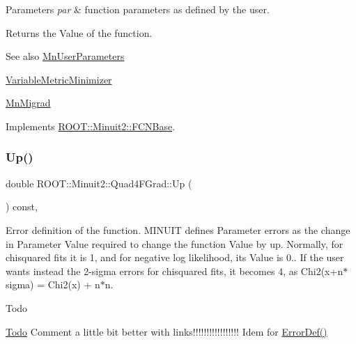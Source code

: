 \begin{DoxyParams}{Parameters}
{\em par} & function parameters as defined by the user.\\
\hline
\end{DoxyParams}
\begin{DoxyReturn}{Returns}
the Value of the function.
\end{DoxyReturn}
\begin{DoxySeeAlso}{See also}
\mbox{\hyperlink{classROOT_1_1Minuit2_1_1MnUserParameters}{Mn\+User\+Parameters}} 

\mbox{\hyperlink{classROOT_1_1Minuit2_1_1VariableMetricMinimizer}{Variable\+Metric\+Minimizer}} 

\mbox{\hyperlink{classROOT_1_1Minuit2_1_1MnMigrad}{Mn\+Migrad}} 
\end{DoxySeeAlso}


Implements \mbox{\hyperlink{classROOT_1_1Minuit2_1_1FCNBase_ae4a86bd94d0d0f5ca6fc8f8ab2bb43cd}{R\+O\+O\+T\+::\+Minuit2\+::\+F\+C\+N\+Base}}.

\mbox{\label{classROOT_1_1Minuit2_1_1Quad4FGrad_a0c477f97bac7a89bea6bdea9fdae92cf}} 
\subsubsection{\texorpdfstring{Up()}{Up()}\hspace{0.1cm}{\footnotesize\ttfamily [1/2]}}
{\footnotesize\ttfamily double R\+O\+O\+T\+::\+Minuit2\+::\+Quad4\+F\+Grad\+::\+Up (\begin{DoxyParamCaption}{ }\end{DoxyParamCaption}) const\hspace{0.3cm}{\ttfamily [inline]}, {\ttfamily [virtual]}}

Error definition of the function. M\+I\+N\+U\+IT defines Parameter errors as the change in Parameter Value required to change the function Value by up. Normally, for chisquared fits it is 1, and for negative log likelihood, its Value is 0.. If the user wants instead the 2-\/sigma errors for chisquared fits, it becomes 4, as Chi2(x+n$\ast$sigma) = Chi2(x) + n$\ast$n.

\begin{DoxyRefDesc}{Todo}
\item[\mbox{\hyperlink{todo__todo000001}{Todo}}]Comment a little bit better with links!!!!!!!!!!!!!!!!! Idem for \mbox{\hyperlink{classROOT_1_1Minuit2_1_1FCNBase_ac4592475c58a65b037ba97ab5f3cba10}{Error\+Def()}}\end{DoxyRefDesc}


